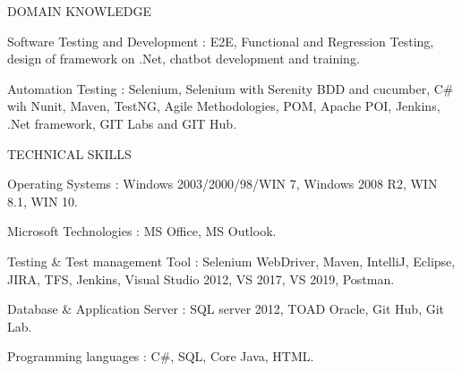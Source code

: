 

\begin{cventries}

  \cventry
    {DOMAIN KNOWLEDGE}
    {}
    {}
    {}
    {
      \begin{cvitems} %
        \item {Software Testing and Development : E2E, Functional and Regression Testing, design of framework on .Net, chatbot development and training.}
	\item {Automation Testing : Selenium, Selenium with Serenity BDD and cucumber,  C\# wih Nunit, Maven, TestNG,  Agile Methodologies, POM, Apache POI, Jenkins, .Net framework, GIT Labs and GIT Hub.}	
      \end{cvitems}
    }


  \cventry
    {TECHNICAL SKILLS}
    {}
    {}
    {}
    {
      \begin{cvitems} %
        \item {Operating Systems : Windows 2003/2000/98/WIN 7, Windows 2008 R2, WIN 8.1, WIN 10.}
	\item {Microsoft Technologies : MS Office, MS Outlook.}	
	\item {Testing \& Test management Tool : Selenium WebDriver, Maven, IntelliJ, Eclipse, JIRA, TFS, Jenkins, Visual Studio 2012, VS 2017, VS 2019, Postman.}	
	\item {Database \& Application Server : SQL server 2012, TOAD Oracle, Git Hub, Git Lab.}	
	\item {Programming languages : C\#, SQL, Core Java, HTML.}	
      \end{cvitems}
    }



\end{cventries}
